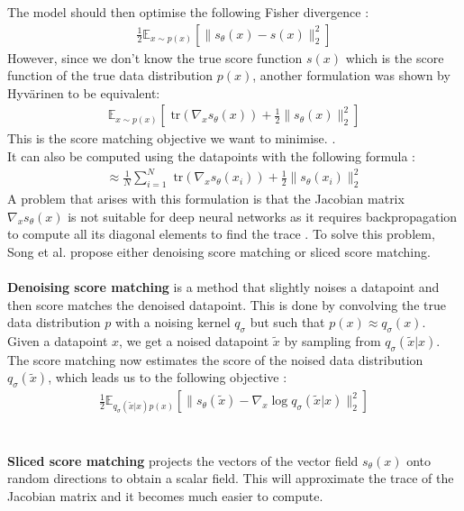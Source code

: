 \documentclass{article}
\begin{document}
The model should then optimise the following Fisher divergence \cite{hyvarinen2005, luo2022understanding}:
\begin{align}
  \frac{1}{2} \mathbb{E}_{x \sim p(x)} \left[ \| s_\theta (x) - s(x) \|_2^2 \right]
\end{align}
However, since we don't know the true score function $s(x)$ which is the score function of the true data distribution $p(x)$, another formulation was shown by Hyvärinen \cite{hyvarinen2005} to be equivalent: 
\begin{align}
  \mathbb{E}_{x \sim p(x)} \left[ \text{ tr}(\nabla_x s_\theta (x)) + \frac{1}{2} \| s_\theta (x) \|_2^2 \right]
\end{align}
This is the score matching objective we want to minimise. \cite{hyvarinen2005}. \\
It can also be computed using the datapoints with the following formula \cite{hyvarinen2005}:
\begin{align}
  \approx \frac{1}{N} \sum_{i=1}^N \text{ tr}(\nabla_x s_\theta (x_i)) + \frac{1}{2} \| s_\theta (x_i) \|_2^2
\end{align}
A problem that arises with this formulation is that the Jacobian matrix $\nabla_x s_\theta (x)$ is not suitable for deep neural networks as it requires backpropagation to compute all its diagonal elements to find the trace \cite{song2020generative, song2019sliced}. To solve this problem, Song et al. \cite{song2020generative} propose either denoising score matching or sliced score matching.
\\\\
\textbf{Denoising score matching} \cite{vincent2010denoising} is a method that slightly noises a datapoint and then score matches the denoised datapoint. This is done by convolving the true data distribution $p$ with a noising kernel $q_\sigma$ but such that $p(x) \approx q_\sigma (x)$. Given a datapoint $x$, we get a noised datapoint $\tilde{x}$ by sampling from $q_\sigma(\tilde{x} | x)$. \\
The score matching now estimates the score of the noised data distribution $q_\sigma(\tilde{x})$, which leads us to the following objective \cite{song2020generative, vincent2010denoising}:
\begin{align}
  \frac{1}{2} \mathbb{E}_{q_\sigma(\tilde{x} | x) p(x)} \left[ \| s_\theta (\tilde{x}) - \nabla_x \log q_\sigma(\tilde{x} | x) \|_2^2 \right]
\end{align}
\\\\
\textbf{Sliced score matching} \cite{song2019sliced} projects the vectors of the vector field $s_\theta (x)$ onto random directions to obtain a scalar field. This will approximate the trace of the Jacobian matrix and it becomes much easier to compute. \cite{song2020generative} \\
\end{document}
